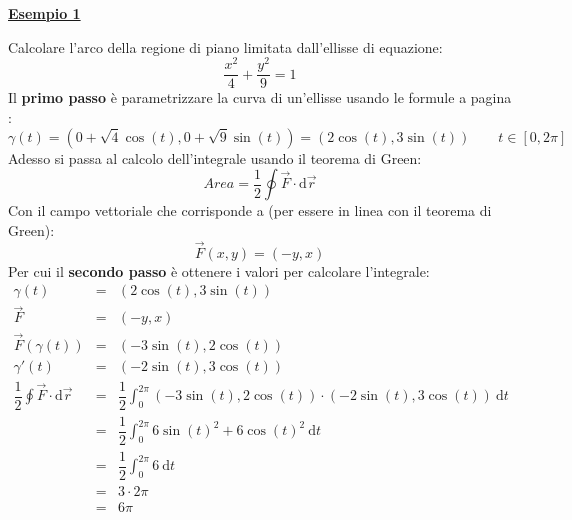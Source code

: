 \documentclass[a4paper]{article}
\newcommand{\example}[1]{\textcolor{Green4}{\textbf{#1}}}
\begin{document}
	\begin{flushleft}
		\example{\underline{Esempio 1}}
	\end{flushleft}
	Calcolare l'arco della regione di piano limitata dall'ellisse di equazione:
	\begin{equation*}
		\dfrac{x^{2}}{4} + \dfrac{y^{2}}{9} = 1
	\end{equation*}
	Il \textbf{primo passo} è parametrizzare la curva di un'ellisse usando le formule a pagina \pageref{eq: parametrizzazione ellisse di centro}:
	\begin{equation*}
		\gamma\left(t\right) = \left(0+\sqrt{4}\cos\left(t\right) , 0+\sqrt{9}\sin\left(t\right)\right) = \left(2\cos\left(t\right), 3\sin\left(t\right)\right) \hspace{2em} t \in \left[0, 2\pi\right]
	\end{equation*}
	Adesso si passa al calcolo dell'integrale usando il teorema di Green:
	\begin{equation*}
		Area = \dfrac{1}{2} \displaystyle\oint \overset{\rightarrow}{F} \cdot \mathrm{d}\overset{\rightarrow}{r}
	\end{equation*}
	Con il campo vettoriale che corrisponde a (per essere in linea con il teorema di Green):
	\begin{equation*}
		\overset{\rightarrow}{F}\left(x,y\right) = \left(-y,x\right)
	\end{equation*}
	Per cui il \textbf{secondo passo} è ottenere i valori per calcolare l'integrale:
	\begin{equation*}
		\begin{array}{rcl}
			\gamma\left(t\right) &=& \left(2\cos\left(t\right), 3\sin\left(t\right)\right) \\ [.1em]
			\overset{\rightarrow}{F} &=& \left(-y, x\right) \\ [.1em]
			\overset{\rightarrow}{F}\left(\gamma\left(t\right)\right) &=& \left(-3\sin\left(t\right), 2\cos\left(t\right)\right) \\ [.3em]
			\gamma'\left(t\right) &=& \left(-2\sin\left(t\right), 3\cos\left(t\right)\right) \\ [1em]
			\dfrac{1}{2} \displaystyle\oint \overset{\rightarrow}{F} \cdot \mathrm{d}\overset{\rightarrow}{r} &=& \dfrac{1}{2}\displaystyle\int_{0}^{2\pi} \left(-3\sin\left(t\right), 2\cos\left(t\right)\right) \cdot \left(-2\sin\left(t\right), 3\cos\left(t\right)\right) \:\mathrm{d}t \\ [1em]
			&=& 
			\dfrac{1}{2}\displaystyle\int_{0}^{2\pi} 6\sin\left(t\right)^{2} + 6\cos\left(t\right)^{2} \:\mathrm{d}t \\ [1em]
			&=& 
			\dfrac{1}{2}\displaystyle\int_{0}^{2\pi} 6 \:\mathrm{d}t \\ [1em]
			&=& 
			3 \cdot 2 \pi \\ [.3em]
			&=& 6\pi
		\end{array}
	\end{equation*}\newpage
\end{document}
